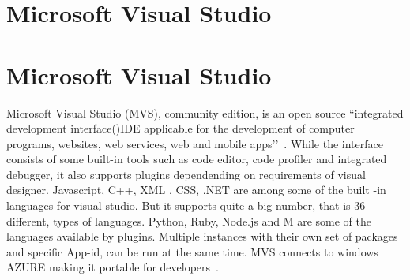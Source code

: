 \section{Microsoft Visual Studio}
\section{Microsoft Visual Studio}

Microsoft Visual Studio (MVS), community edition, is an open source ``integrated
development interface()IDE applicable for the development of computer programs, 
websites, web services, web and mobile apps’’~\cite{hid-sp18-415-www-wikipedia-org}. While 
the interface consists of some built-in tools such as code editor, code profiler
and integrated debugger, it also supports plugins dependending on  requirements 
of visual designer. Javascript, C++, XML , CSS, .NET are among some of the 
built -in languages for visual studio. But it supports quite a big number, 
that is 36 different, types of languages. Python, Ruby, Node.js and M are 
some of the languages available by plugins.  Multiple instances with their own
set of packages and specific App-id, can be run at the same time. MVS 
connects to windows AZURE making it portable for developers~\cite{hid-sp18-415-www-wikipedia-org}.
